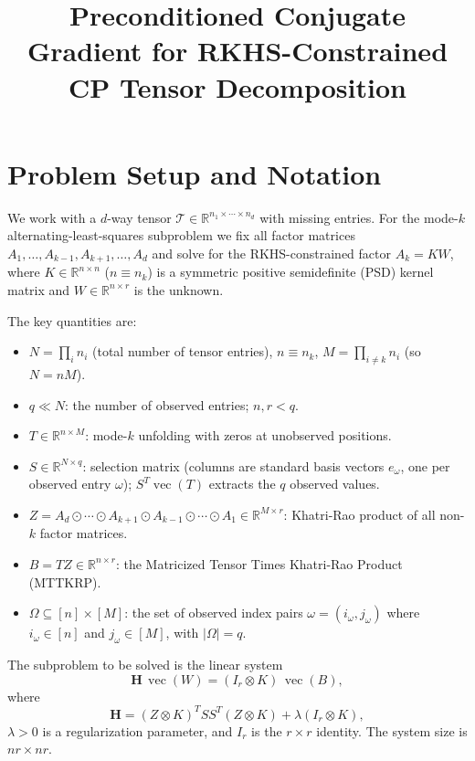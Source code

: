 \documentclass[12pt]{article}
\title{Preconditioned Conjugate Gradient for RKHS-Constrained CP Tensor Decomposition}
\author{}
\date{}
\theoremstyle{definition}
\DeclareMathOperator{\vecop}{vec}
\begin{document}
\maketitle

\section{Problem Setup and Notation}

We work with a $d$-way tensor $\mathcal{T} \in \mathbb{R}^{n_1 \times \cdots \times n_d}$ with
missing entries.  For the mode-$k$ alternating-least-squares subproblem we fix all factor
matrices $A_1,\dots,A_{k-1},A_{k+1},\dots,A_d$ and solve for the RKHS-constrained factor
$A_k = KW$, where $K \in \mathbb{R}^{n \times n}$ ($n \equiv n_k$) is a symmetric positive
semidefinite (PSD) kernel matrix and $W \in \mathbb{R}^{n \times r}$ is the unknown.

The key quantities are:
\begin{itemize}
  \item $N = \prod_i n_i$ (total number of tensor entries), $n \equiv n_k$,
        $M = \prod_{i \neq k} n_i$ (so $N = nM$).
  \item $q \ll N$: the number of observed entries; $n, r < q$.
  \item $T \in \mathbb{R}^{n \times M}$: mode-$k$ unfolding with zeros at unobserved positions.
  \item $S \in \mathbb{R}^{N \times q}$: selection matrix (columns are standard basis vectors
        $e_\omega$, one per observed entry $\omega$); $S^T \vecop(T)$ extracts the $q$ observed
        values.
  \item $Z = A_d \odot \cdots \odot A_{k+1} \odot A_{k-1} \odot \cdots \odot A_1
        \in \mathbb{R}^{M \times r}$: Khatri-Rao product of all non-$k$ factor matrices.
  \item $B = TZ \in \mathbb{R}^{n \times r}$: the Matricized Tensor Times Khatri-Rao Product
        (MTTKRP).
  \item $\Omega \subseteq [n] \times [M]$: the set of observed index pairs
        $\omega = (i_\omega, j_\omega)$ where $i_\omega \in [n]$ and $j_\omega \in [M]$,
        with $|\Omega| = q$.
\end{itemize}

The subproblem to be solved is the linear system
\begin{equation}
  \mathbf{H}\,\vecop(W) = (I_r \otimes K)\,\vecop(B),
  \label{eq:system}
\end{equation}
where
\begin{equation}
  \mathbf{H} = (Z \otimes K)^T S S^T (Z \otimes K) + \lambda (I_r \otimes K),
  \label{eq:H}
\end{equation}
$\lambda > 0$ is a regularization parameter, and $I_r$ is the $r \times r$ identity.
The system size is $nr \times nr$.
\end{document}
